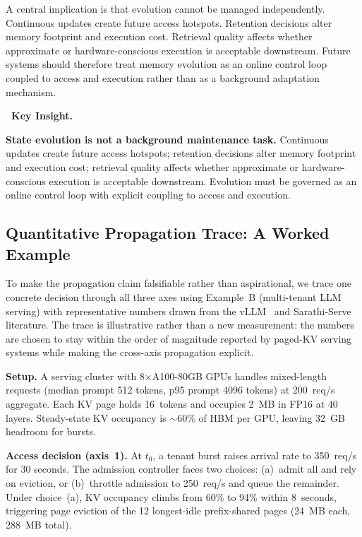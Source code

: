 \documentclass[acmsmall,screen,review]{acmart}
\newenvironment{keybox}{%
  \vspace{6pt}\noindent
  \begin{lrbox}{\keyboxcontent}
  \begin{minipage}{\dimexpr\linewidth-2\fboxsep-2\fboxrule\relax}
  \raggedright
  \textbf{\faLightbulbO\ \textcolor{keyborder}{Key Insight.}}\par\smallskip
}{%
  \end{minipage}
  \end{lrbox}
  \fcolorbox{keyborder}{keybg}{\usebox{\keyboxcontent}}%
  \vspace{6pt}%
}
\begin{document}
A central implication is that evolution cannot be managed independently. Continuous updates create future access hotspots. Retention decisions alter memory footprint and execution cost. Retrieval quality affects whether approximate or hardware-conscious execution is acceptable downstream. Future systems should therefore treat memory evolution as an online control loop coupled to access and execution rather than as a background adaptation mechanism.

\begin{keybox}
\textbf{State evolution is not a background maintenance task.} Continuous updates create future access hotspots; retention decisions alter memory footprint and execution cost; retrieval quality affects whether approximate or hardware-conscious execution is acceptable downstream. Evolution must be governed as an online control loop with explicit coupling to access and execution.
\end{keybox}

\subsection{Quantitative Propagation Trace: A Worked Example}
\label{sec:propagation-trace}

To make the propagation claim falsifiable rather than aspirational, we trace one concrete decision through all three axes using Example~B (multi-tenant LLM serving) with representative numbers drawn from the vLLM~\cite{kwon2023pagedattention} and Sarathi-Serve~\cite{agrawal2024sarathi} literature. The trace is illustrative rather than a new measurement: the numbers are chosen to stay within the order of magnitude reported by paged-KV serving systems while making the cross-axis propagation explicit.

\smallskip\noindent\textbf{Setup.} A serving cluster with 8$\times$A100-80GB GPUs handles mixed-length requests (median prompt 512 tokens, p95 prompt 4096 tokens) at 200~req/s aggregate. Each KV page holds 16~tokens and occupies 2~MB in FP16 at 40 layers. Steady-state KV occupancy is $\sim$60\% of HBM per GPU, leaving 32~GB headroom for bursts.

\smallskip\noindent\textbf{Access decision (axis~1).} At $t_0$, a tenant burst raises arrival rate to 350~req/s for 30 seconds. The admission controller faces two choices: (a)~admit all and rely on eviction, or (b)~throttle admission to 250~req/s and queue the remainder. Under choice~(a), KV occupancy climbs from 60\% to 94\% within 8~seconds, triggering page eviction of the 12 longest-idle prefix-shared pages (24~MB each, 288~MB total).
\end{document}
